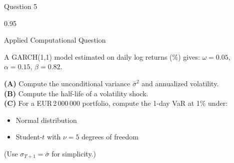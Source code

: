 \documentclass[9pt, aspectratio=169, t]{beamer}
\begin{document}
\begin{frame}{Question 5}
    \begin{cminipage}{0.95\textwidth}
    \begin{alertblock}{Applied Computational Question}
        {\small
        A GARCH(1,1) model estimated on daily log returns (\%) gives:
        $\omega = 0.05$, $\alpha = 0.15$, $\beta = 0.82$.

        \textcolor{MainBlue}{\textbf{(A)}} Compute the unconditional variance $\bar{\sigma}^2$ and annualized volatility.\\[3pt]
        \textcolor{MainBlue}{\textbf{(B)}} Compute the half-life of a volatility shock.\\[3pt]
        \textcolor{MainBlue}{\textbf{(C)}} For a EUR\,2\,000\,000 portfolio, compute the 1-day VaR at 1\% under:
                \begin{itemize}\setlength{\itemsep}{0pt}
                    \item Normal distribution
                    \item Student-$t$ with $\nu = 5$ degrees of freedom
                \end{itemize}
                \vspace{-2pt}(Use $\sigma_{T+1} = \bar{\sigma}$ for simplicity.)
        }
    \end{alertblock}
    \end{cminipage}
\end{frame}
\end{document}
